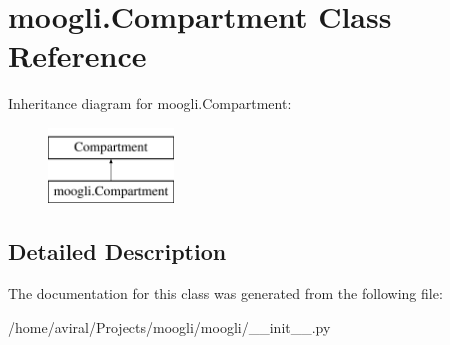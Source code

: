 \hypertarget{classmoogli_1_1Compartment}{\section{moogli.\-Compartment Class Reference}
\label{classmoogli_1_1Compartment}
}
Inheritance diagram for moogli.\-Compartment\-:\begin{figure}[H]
\begin{center}
\leavevmode
\includegraphics[height=2.000000cm]{classmoogli_1_1Compartment}
\end{center}
\end{figure}


\subsection{Detailed Description}


The documentation for this class was generated from the following file\-:\begin{DoxyCompactItemize}
\item 
/home/aviral/\-Projects/moogli/moogli/\-\_\-\-\_\-init\-\_\-\-\_\-.\-py\end{DoxyCompactItemize}
